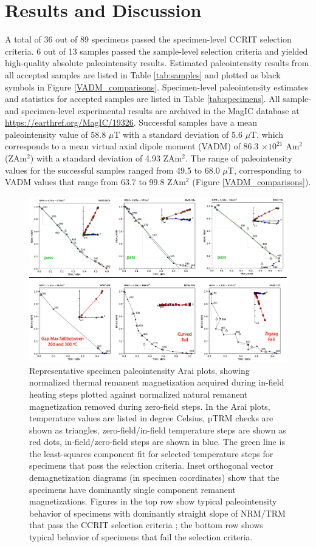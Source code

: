 \documentclass[draft]{agujournal2019}
\begin{document}
\section{Results and Discussion}

A total of 36 out of 89 specimens passed the specimen-level CCRIT selection criteria. 6 out of 13 samples passed the sample-level selection criteria and yielded high-quality absolute paleointensity results. Estimated paleointensity results from all accepted samples are listed in Table \ref{tab:samples} and plotted as black symbols in Figure \ref{VADM_comparisons}. Specimen-level paleointensity estimates and statistics for accepted samples are listed in Table \ref{tab:specimens}. All sample- and specimen-level experimental results are archived in the MagIC database at \url{https://earthref.org/MagIC/19326}. Successful samples have a mean paleointensity value of 58.8 $\mu$T with a standard deviation of 5.6 $\mu$T, which corresponds to a mean virtual axial dipole moment (VADM) of 86.3 $\times 10^{21}$ Am$^{2}$ (ZAm$^{2}$) with a standard deviation of 4.93 ZAm$^{2}$. The range of paleointensity values for the successful samples ranged from 49.5 to 68.0 $\mu$T, corresponding to VADM values that range from 63.7 to 99.8 ZAm$^{2}$ (Figure \ref{VADM_comparisons}).

\begin{figure}
\noindent\includegraphics[width=30pc]{../Figure/IZZI_results_revision.pdf}
\caption{Representative specimen paleointensity Arai plots, showing normalized thermal remanent magnetization acquired during in-field heating steps plotted against normalized natural remanent magnetization removed during zero-field steps. In the Arai plots, temperature values are listed in degree Celsius, pTRM checks are shown as triangles, zero-field/in-field temperature steps are shown as red dots, in-field/zero-field steps are shown in blue. The green line is the least-squares component fit for selected temperature steps for specimens that pass the selection criteria. Inset orthogonal vector demagnetization diagrams (in specimen coordinates) show that the specimens have dominantly single component remanent magnetizations. Figures in the top row show typical paleointensity behavior of specimens with dominantly straight slope of NRM/TRM that pass the CCRIT selection criteria \cite{Cromwell2015b}; the bottom row shows typical behavior of specimens that fail the selection criteria.
}
\label{IZZI_results}
\end{figure}
\end{document}
